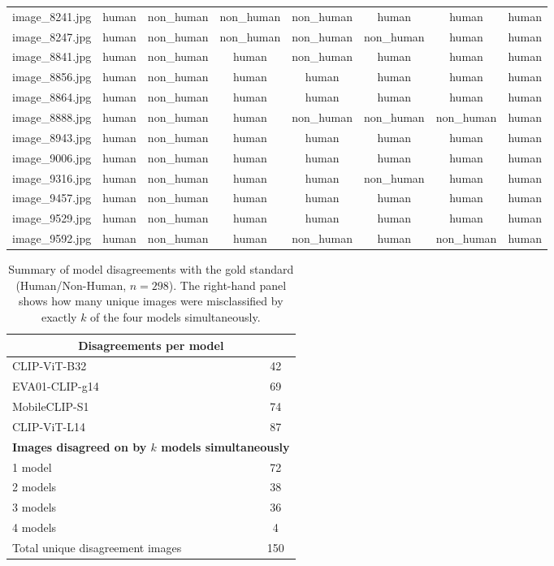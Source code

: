 \documentclass[hidelinks, 11pt]{article}
\begin{document}
\begin{longtable}{@{}lccccccc@{}}
image\_8241.jpg  & human     & non\_human & non\_human & non\_human & human     & human     & human     \\
image\_8247.jpg  & human     & non\_human & non\_human & non\_human & non\_human & human     & human     \\
image\_8841.jpg  & human     & non\_human & human     & non\_human & human     & human     & human     \\
image\_8856.jpg  & human     & non\_human & human     & human     & human     & human     & human     \\
image\_8864.jpg  & human     & non\_human & human     & human     & human     & human     & human     \\
image\_8888.jpg  & human     & non\_human & human     & non\_human & non\_human & non\_human & human     \\
image\_8943.jpg  & human     & non\_human & human     & human     & human     & human     & human     \\
image\_9006.jpg  & human     & non\_human & human     & human     & human     & human     & human     \\
image\_9316.jpg  & human     & non\_human & human     & human     & non\_human & human     & human     \\
image\_9457.jpg  & human     & non\_human & human     & human     & human     & human     & human     \\
image\_9529.jpg  & human     & non\_human & human     & human     & human     & human     & human     \\
image\_9592.jpg  & human     & non\_human & human     & non\_human & human     & non\_human & human     \\

\end{longtable}

\begin{table}[htbp]
\centering
\caption{Summary of model disagreements with the gold standard (Human/Non-Human, $n=298$). The right-hand panel shows how many unique images were misclassified by exactly $k$ of the four models simultaneously.}
\label{tab:disagreement_summary_humannonhuman}
\begin{tabular}{@{}lc@{}}
\toprule
\multicolumn{2}{c}{\textbf{Disagreements per model}} \\
\midrule
CLIP-ViT-B32   & 42 \\
EVA01-CLIP-g14 & 69 \\
MobileCLIP-S1  & 74 \\
CLIP-ViT-L14   & 87 \\
\midrule
\multicolumn{2}{c}{\textbf{Images disagreed on by $k$ models simultaneously}} \\
\midrule
1 model  & 72 \\
2 models & 38 \\
3 models & 36 \\
4 models & 4 \\
\midrule
Total unique disagreement images & 150 \\
\bottomrule
\end{tabular}
\end{table}
\end{document}

